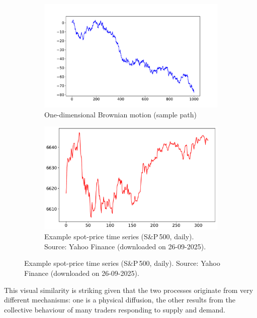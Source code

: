 \begin{figure}[htbp]
\centering
\begin{subfigure}[t]{0.48\textwidth}
    \centering
    \includegraphics[width=\linewidth]{images/brownian_motion_1d.pdf}
    \caption{One-dimensional Brownian motion (sample path)}
    \label{fig:brownian}
\end{subfigure}\hfill
\begin{subfigure}[t]{0.48\textwidth}
    \centering
    \includegraphics[width=\linewidth]{images/spot_price_sp500.pdf}
    \caption{Example spot-price time series (S\&P\,500, daily). Source: Yahoo Finance (downloaded on 26-09-2025).}
    \label{fig:spot}
\end{subfigure}
\end{figure}

This visual similarity is striking given that the two processes originate from very different mechanisms: one is a physical diffusion, the other results from the collective behaviour of many traders responding to supply and demand.


